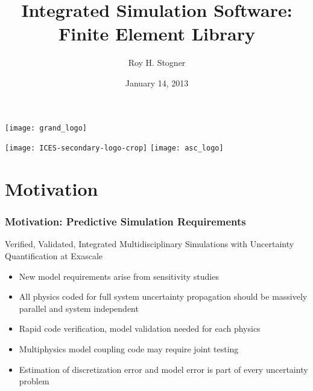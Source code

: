 \documentclass[mathserif]{beamer}
\date{January 14, 2013}
\author[R. H. Stogner]{Roy H. Stogner}
\institute{The University of Texas at Austin}
\title[\libMesh]{Integrated Simulation Software:\\
\libMesh{} Finite Element Library}
\newcommand{\CVer}[1]{#1}
\newcommand{\CVal}[1]{#1}
\newcommand{\CUQ}[1]{#1}
\newcommand{\CInt}[1]{#1}
\newcommand{\CExa}[1]{#1}
\begin{document}
\begin{frame}
\begin{center}
\texttt{[image: grand\_logo]}\\
\end{center}
\titlepage
\vspace{-0.4in}
\texttt{[image: ICES-secondary-logo-crop]}
\hspace*{\fill}
\texttt{[image: asc\_logo]}
\end{frame}



\section{Motivation}


\begin{frame}
\frametitle{Motivation: Predictive Simulation Requirements}
\begin{block}{\CVer{Verified}, \CVal{Validated}, \CInt{Integrated
Multidisciplinary} Simulations with \CUQ{Uncertainty
Quantification} at \CExa{Exascale}}
\begin{itemize}
\item \CInt{New model requirements} arise from \CUQ{sensitivity studies}
\item All physics coded for full system uncertainty propagation should
\CExa{be massively parallel} and \CExa{system independent}
\item Rapid \CVer{code verification}, \CVal{model validation} needed
for each physics
\item \CInt{Multiphysics model coupling} code may require \CVer{joint testing}
\item \CVer{Estimation of discretization error and model error}
is part of every \CUQ{uncertainty problem}
\end{itemize}
\end{block}
\end{frame}
\end{document}
